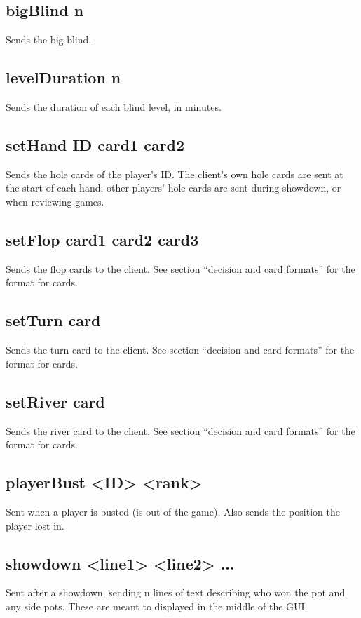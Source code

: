\documentclass{article}
\begin{document}
\subsection*{bigBlind \textlangle{}n\textrangle{}}
Sends the big blind.

\subsection*{levelDuration \textlangle{}n\textrangle{}}
Sends the duration of each blind level, in minutes.

\subsection*{setHand \textlangle{}ID\textrangle{} \textlangle{}card1\textrangle{} \textlangle{}card2\textrangle{}}
Sends the hole cards of the player's ID. The client's own hole cards are sent at the start of each hand; other players' hole cards are sent during showdown, or when reviewing games.

\subsection*{setFlop \textlangle{}card1\textrangle{} \textlangle{}card2\textrangle{}  \textlangle{}card3\textrangle{}}
Sends the flop cards to the client. See section ``decision and card formats'' for the format for cards.

\subsection*{setTurn \textlangle{}card\textrangle{}}
Sends the turn card to the client. See section ``decision and card formats'' for the format for cards.

\subsection*{setRiver \textlangle{}card\textrangle{}}
Sends the river card to the client. See section ``decision and card formats'' for the format for cards.

\subsection*{playerBust <ID> <rank>}
Sent when a player is busted (is out of the game). Also sends the position the player lost in.

\subsection*{showdown <line1> <line2> ... }
Sent after a showdown, sending n lines of text describing who won the pot and any side pots. These are meant to displayed in the middle of the GUI.
\end{document}
